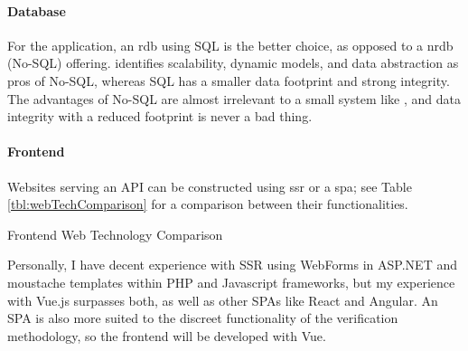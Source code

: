 \paragraph{Database}
For the \projectname{} application, an \gls{rdb} using SQL is the
better choice, as opposed to a \gls{nrdb} (No-SQL) offering.
\cite{databaseComparison} identifies scalability, dynamic
models, and data abstraction as pros of No-SQL, whereas SQL 
has a smaller data footprint and strong integrity. The
advantages of No-SQL are almost irrelevant to a small system
like \projectname{}, and data integrity with a reduced 
footprint is never a bad thing.

\paragraph{Frontend}
Websites serving an API can be constructed using \gls{ssr}
or a \gls{spa}; see Table \ref{tbl:webTechComparison} for a
comparison between their functionalities.

\begin{table}[h]
  \centering
  \small
  
  \caption{Frontend Web Technology Comparison}
  \label{tbl:webTechComparison}
\end{table}

Personally, I have decent experience with SSR using
WebForms in ASP.NET and moustache
templates within PHP and Javascript
frameworks, but my experience with Vue.js
surpasses both, as well as other SPAs like React and
Angular.
An SPA is also more suited to the discreet functionality of
the verification methodology, so the frontend will be
developed with Vue.

